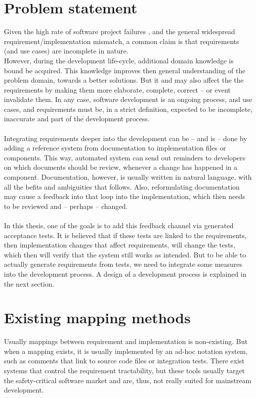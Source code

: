 \section{Problem statement}
Given the high rate of software project failures\cite{verner2008} \cite{charette2005}, and the general widespread requirement/implementation mismatch, a common claim is that requirements (and use cases) are incomplete in nature.\\
However, during the development life-cycle, additional domain knowledge is bound be acquired. This knowledge improves then general understanding of the problem domain, towards a better solutions. But it and may also affect the the requirements by making them more elaborate, complete, correct -- or event invalidate them. In any case, software development is an ongoing process, and use cases, and requirements must be, in a strict definition, expected to be incomplete, inaccurate and part of the development process.\\\\
Integrating requirements deeper into the development can be -- and is -- done by adding a reference system from documentation to implementation files or components. This way, automated system can send out reminders to developers on which documents should be review, whenever a change has happened in a component.
Documentation, however, is usually written in natural language, with all the befits and ambiguities that follows. Also, reformulating documentation may cause a feedback into that loop into the implementation, which then needs to be reviewed and -- perhaps -- changed.\\\\
In this thesis, one of the goals is to add this feedback channel via generated acceptance tests. It is believed that if these tests are linked to the requirements, then implementation changes that affect requirements, will change the tests, which then will verify that the system still works as intended. But to be able to actually generate requirements from tests, we need to integrate some measures into the development process. A design of a development process is explained in the next section.

\section{Existing mapping methods}
Usually mappings between requirement and implementation is non-existing. But when a mapping exists, it is usually implemented by an ad-hoc notation system, such as comments that link to source code files or integration tests. There exist systems that control the requirement tractability, but these tools usually target the safety-critical software market and are, thus, not really suited for mainstream development.\\%

